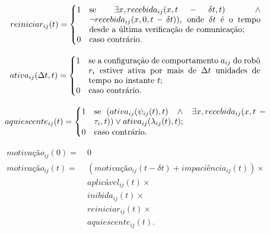 \begin{equation}
    reiniciar_{ij}(t) =
    \begin{cases}
        1 & \parbox[t]{.6\textwidth}{se $\exists x, recebida_{ij}(x, t - \delta t, t) \ \land \ \lnot recebida_{ij}(x, 0, t - \delta t))$, onde $\delta t$ é o tempo desde a última verificação de comunicação;} \\
        0 & \text{caso contrário.}
    \end{cases}
\end{equation}

\begin{equation}
    ativa_{ij}(\Delta t, t) =
    \begin{cases}
        1 & \parbox[t]{.6\textwidth}{se a configuração de comportamento $a_{ij}$ do robô $r_i$ estiver ativa por mais de $\Delta t$ unidades de tempo no instante $t$;} \\
        0 & \text{caso contrário.}
    \end{cases}
\end{equation}

\begin{equation}
    aquiescente_{ij}(t) =
    \begin{cases}
        1 & \parbox[t]{.6\textwidth}{se $(ativa_{ij}(\psi_{ij}(t), t) \ \land \ \exists x, recebida_{ij}(x, t - \tau_i, t))
        \lor ativa_{ij}(\lambda_{ij}(t), t)$;} \\
        0 & \text{caso contrário.}
    \end{cases}
\end{equation}

\begin{equation}
    \begin{aligned}
        motivação_{ij}(0) = \ & 0 \\
        motivação_{ij}(t) = \ & (motivação_{ij}(t - \delta t) + impaciência_{ij}(t)) \times \\
        & aplicável_{ij}(t) \times \\
        & inibida_{ij}(t) \times \\
        & reiniciar_{ij}(t) \times \\
        & aquiescente_{ij}(t).
    \end{aligned}
\end{equation}
